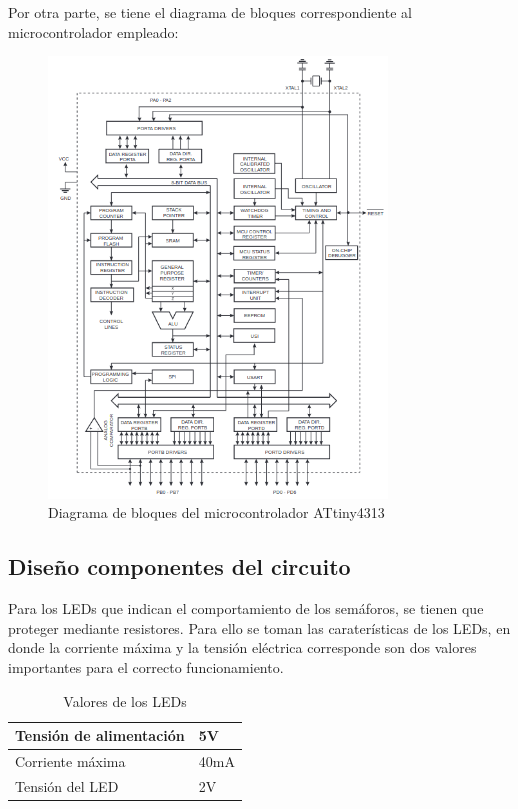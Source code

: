 \documentclass[12pt,letterpaper]{article}
\begin{document}
Por otra parte, se tiene el diagrama de bloques correspondiente al microcontrolador empleado:

\begin{figure}[H]
    \centering
    \includegraphics[width=9cm]{Imagenes/block.png}
    \caption{Diagrama de bloques del microcontrolador ATtiny4313}
    \label{Diagrama de bloques del microcontrolador ATtiny4313}
\end{figure}

\newpage

\subsection{Diseño componentes del circuito}
Para los LEDs que indican el comportamiento de los semáforos, se tienen que proteger mediante resistores. Para ello se toman las caraterísticas de los LEDs, en donde la corriente máxima y la tensión eléctrica corresponde son dos valores importantes para el correcto funcionamiento. 
\begin{table}[H]
\centering
\caption{Valores de los LEDs}
\label{tab2}
\begin{tabular}{|l|l|}
\hline
Tensión de alimentación & 5V   \\ \hline
Corriente máxima        & 40mA \\ \hline
Tensión del LED         & 2V   \\ \hline
\end{tabular}
\end{table}
\end{document}
